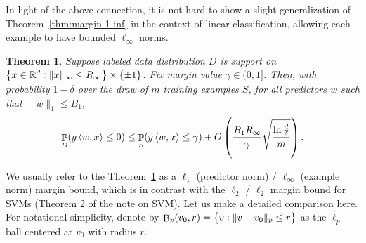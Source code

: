 \documentclass{article}
\newtheorem{theorem}{Theorem}
\DeclareMathOperator*{\B}{{\rm B}}
\DeclareMathOperator{\PP}{{\mathbb P}}
\newcommand{\RR}{\mathbb{R}} %
\newcommand{\inner}[2]{\left\langle #1,#2 \right\rangle}
\begin{document}
In light of the above connection, it is not hard to show a slight generalization of Theorem~\ref{thm:margin-1-inf} in the context of linear classification, allowing each example to have bounded $\ell_\infty$ norms.
\begin{theorem}
Suppose labeled data distribution $D$ is support on $\cbr{x \in \RR^d: \| x \|_\infty \leq R_\infty} \times \cbr{\pm 1}$.
Fix margin value $\gamma \in (0,1]$. Then, with probability $1-\delta$ over the draw of $m$ training examples $S$, for all predictors $w$ such that $\| w \|_1 \leq B_1$,
\[ \PP_D(y \inner{w}{x} \leq 0) \leq \PP_S(y \inner{w}{x} \leq \gamma) + O\del{\frac{B_1 R_\infty}{\gamma}\sqrt{\frac{\ln\frac{d}{\delta}}{m}}}. \]
\label{thm:margin-1-inf-2}
\end{theorem}


We usually refer to the Theorem~\ref{thm:margin-1-inf-2} as a $\ell_1$ (predictor norm) / $\ell_\infty$ (example norm) margin bound, which is in contrast with the $\ell_2$ / $\ell_2$ margin bound for SVMs (Theorem 2 of the note on SVM). Let us make a detailed comparison here. For notational simplicity, denote by $\B_p(v_0,r) = \cbr{v: \| v - v_0\|_p \leq r}$ as the $\ell_p$ ball centered at $v_0$ with radius $r$.
\end{document}
